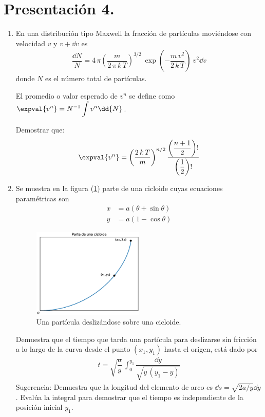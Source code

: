 \section{Presentación 4.}
\begin{enumerate}
\item En una distribución tipo Maxwell la fracción de partículas moviéndose con velocidad $v$ y $v +\dd{v}$ es
\begin{align*}
\dfrac{\dd{N}}{N} = 4 \, \pi \left( \dfrac{m}{2 \, \pi \, k \, T} \right)^{3/2} \: \exp \left( - \dfrac{m \, v^{2}}{2 \, k \, T} \right) \: v^{2} \dd{v}
\end{align*}
donde $N$ es el número total de partículas. 
\par
El promedio o valor esperado de $v^{n}$ se define como $\displaystyle \expval{v^{n}} = N^{-1} \int v^{n} \dd{N}$.
\par
Demostrar que:
\begin{align*}
\expval{v^{n}} = \left( \dfrac{2 \, k \, T}{m} \right)^{n/2} \dfrac{\left( \dfrac{n + 1}{2} \right) !} { \left( \dfrac{1}{2} \right) !}
\end{align*}
\item Se muestra en la figura (\ref{fig:figura_cicloide}) parte de una cicloide cuyas ecuaciones paramétricas son
\begin{align*}
x &= a (\theta + \sin \theta) \\[0.5em]
y &= a (1 - \cos \theta)
\end{align*}
\begin{figure}[H]
        \centering
        \includegraphics[width=0.5\textwidth]{Imagenes/plot_cicloide.eps}
        \caption{Una partícula deslizándose sobre una cicloide.}
        \label{fig:figura_cicloide}
\end{figure}
Demuestra que el tiempo que tarda una partícula para deslizarse sin fricción a lo largo de la curva desde el punto $(x_{1}, y_{1})$ hasta el origen, está dado por
\begin{align*}
t = \sqrt{\dfrac{a}{g}} \, \int_{0}^{y_{1}} \dfrac{\dd{y}}{\sqrt{y \, (y_{1}- y)}}
\end{align*}
Sugerencia: Demuestra que la longitud del elemento de arco es $\dd{s} = \sqrt{2a/y} \dd{y}$. Evalúa la integral para demostrar que el tiempo es independiente de la posición inicial $y_{1}$.
\end{enumerate}
